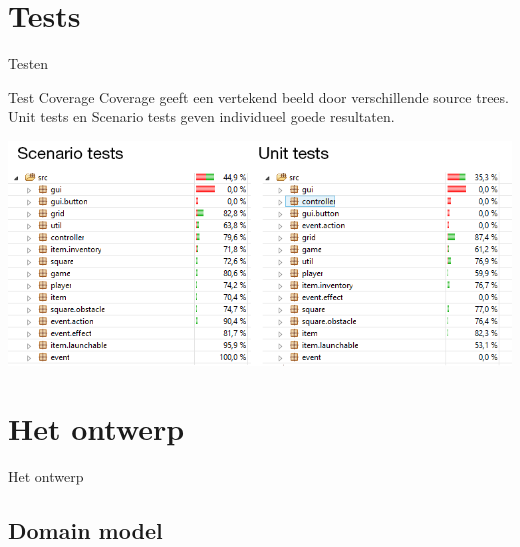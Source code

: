\documentclass[t]{beamer}
\begin{document}
\section{Tests}

\begin{frame}{Testen}
\begin{multicols}{2}
\tableofcontents[currentsection]
\end{multicols}
\end{frame}

\begin{frame}{Test Coverage}
Coverage geeft een vertekend beeld door verschillende source trees.\\
Unit tests en Scenario tests geven individueel goede resultaten.
\begin{center}
\includegraphics[scale=0.5]{images/test}
\end{center}
\end{frame}

\section{Het ontwerp}

\begin{frame}{Het ontwerp}
\begin{multicols}{2}
\tableofcontents[currentsection]
\end{multicols}
\end{frame}

\subsection{Domain model}
\end{document}
